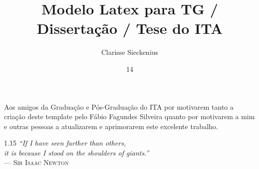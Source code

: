 \documentclass[dsc,eng]{ita} %
\author{Clarisse Sieckenius}{de~Souza}
\title{Modelo Latex para TG / Dissertação / Tese do ITA}
\date{14}{março}{2024}
\begin{document}
  \frontmatter

  \maketitle

  \begin{itadedication}
    Aos amigos da Graduação e Pós-Graduação do ITA por motivarem tanto a criação
    deste template pelo Fábio Fagundes Silveira quanto por motivarem a mim e
    outras pessoas a atualizarem e aprimorarem este excelente trabalho.
  \end{itadedication}

  \begin{itathanks}
    
  \end{itathanks}

  \thispagestyle{empty}
  \ifhyperref{}\fi
  \begin{flushright}
    \begin{spacing}{1.15}
      \mbox{}\vfill
      {\sffamily\itshape
      ``If I have seen farther than others,\\
      it is because I stood on the shoulders of giants.''\\}
      --- \textsc{Sir Isaac Newton}
    \end{spacing}
  \end{flushright}

  \begin{abstract}
    \noindent
    
  \end{abstract}

  \begin{englishabstract}
    \noindent
    
  \end{englishabstract}

  \listoffigures

  \listoftables

  \listofabbreviations
  

  \listofsymbols
  
\end{document}
